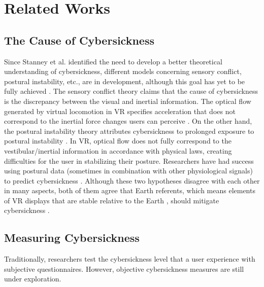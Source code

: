 \section{Related Works}
\subsection{The Cause of Cybersickness}
Since Stanney et al. \cite{stanney_aftereffects_1998} identified the need to develop a better theoretical understanding of cybersickness, 
different models concerning sensory conflict, postural instability, etc., are in development, although this goal has yet to be fully achieved \cite{stanney_identifying_2020}. 
The sensory conflict theory claims that the cause of cybersickness is the discrepancy between the visual and inertial information.
The optical flow generated by virtual locomotion in VR specifies acceleration that does not correspond to the inertial force changes users can perceive \cite{lackner_motion_2014, oman_motion_1990, laviola_discussion_2000}.
On the other hand, the postural instability theory attributes cybersickness to prolonged exposure to postural instability \cite{riccio_ecological_1991}.
In VR, optical flow does not fully correspond to the vestibular/inertial information in accordance with physical laws, creating difficulties for the user in stabilizing their posture.
Researchers have had success using postural data (sometimes in combination with other physiological signals) to predict cybersickness 
\cite{islam_cybersickness_2021, cortes_eeg-based_2023}. 
Although these two hypotheses disagree with each other in many aspects, both of them agree that 
Earth referents, which means elements of VR displays that are stable relative to the Earth \cite{bailey_using_2022},
should mitigate cybersickness \cite{stanney_identifying_2020, bailey_using_2022}.

\subsection{Measuring Cybersickness}

Traditionally, researchers test the cybersickness level that a user experience with subjective questionnaires.
However, objective cybersickness measures are still under exploration.

